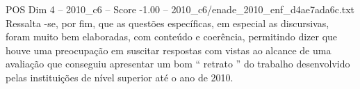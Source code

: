 \begin{textsample}{POS Dim 4 – 2010\_c6 – Score -1.00 – 2010\_c6/enade\_2010\_enf\_d4ae7ada6c.txt}
Ressalta -se, por fim, que as questões específicas, em especial as discursivas, foram muito bem elaboradas, com conteúdo e coerência, permitindo dizer que houve uma preocupação em suscitar respostas com vistas ao alcance de uma avaliação que conseguiu apresentar um bom “ retrato ” do trabalho desenvolvido pelas instituições de nível superior até o ano de 2010.

\end{textsample}
